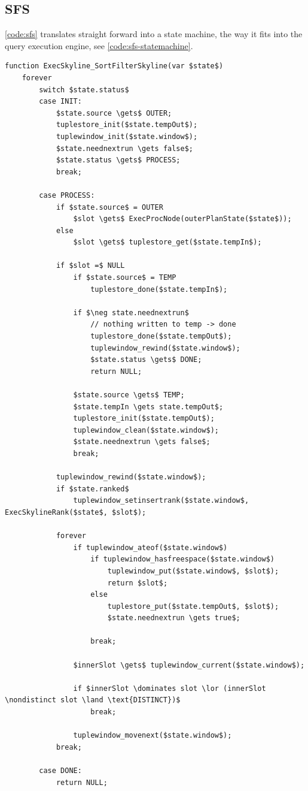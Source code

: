 

\subsection{SFS}
\autoref{code:sfs} translates straight forward into a state machine,
the way it fits into the query execution engine, see
\autoref{code:sfs-statemachine}.

\begin{lstlisting}[language=pseudo,
caption={Pseudo-code for SFS},
label={code:sfs-statemachine}
]
function ExecSkyline_SortFilterSkyline(var $state$)
	forever
		switch $state.status$
		case INIT: 
			$state.source \gets$ OUTER; 
			tuplestore_init($state.tempOut$);
			tuplewindow_init($state.window$);
			$state.neednextrun \gets false$;
			$state.status \gets$ PROCESS; 
			break;

		case PROCESS:
			if $state.source$ = OUTER
				$slot \gets$ ExecProcNode(outerPlanState($state$));
			else
				$slot \gets$ tuplestore_get($state.tempIn$);

			if $slot =$ NULL
				if $state.source$ = TEMP
					tuplestore_done($state.tempIn$);

				if $\neg state.neednextrun$
					// nothing written to temp -> done
					tuplestore_done($state.tempOut$);
					tuplewindow_rewind($state.window$);
					$state.status \gets$ DONE;
					return NULL;

				$state.source \gets$ TEMP;
				$state.tempIn \gets state.tempOut$;
				tuplestore_init($state.tempOut$);
				tuplewindow_clean($state.window$);
				$state.neednextrun \gets false$;
				break;

			tuplewindow_rewind($state.window$);
			if $state.ranked$
				tuplewindow_setinsertrank($state.window$, ExecSkylineRank($state$, $slot$);

			forever
				if tuplewindow_ateof($state.window$)
					if tuplewindow_hasfreespace($state.window$)
						tuplewindow_put($state.window$, $slot$);
						return $slot$;
					else
						tuplestore_put($state.tempOut$, $slot$);
						$state.neednextrun \gets true$;

					break;

				$innerSlot \gets$ tuplewindow_current($state.window$);

				if $innerSlot \dominates slot \lor (innerSlot \nondistinct slot \land \text{DISTINCT})$
					break;

				tuplewindow_movenext($state.window$);
			break;

		case DONE:
			return NULL;
\end{lstlisting}

